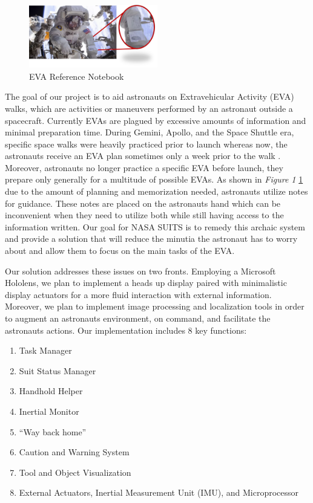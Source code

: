 \documentclass{article}
\begin{document}
\begin{figure}[!htb]
  \centering
  \includegraphics[width=0.5\textwidth]{assets/spacesuitdisplay.png}
  \caption{EVA Reference Notebook}
  \label{fig:spacesuitdisplay}
\end{figure}

The goal of our project is to aid astronauts on Extravehicular Activity 
(EVA) walks, which are activities or maneuvers performed by an astronaut 
outside a spacecraft. Currently EVAs are plagued by excessive amounts of 
information and minimal preparation time. During Gemini, Apollo, and the 
Space Shuttle era, specific space walks were heavily practiced prior to 
launch whereas now, the astronauts receive an EVA plan sometimes only a 
week prior to the walk \autocite{mannedspaceflight}. Moreover, 
astronauts no longer practice a specific EVA before launch, they prepare 
only generally for a multitude of possible EVAs. As shown in 
\textit{Figure 1} \ref{fig:spacesuitdisplay} due to the amount of 
planning and memorization needed, astronauts utilize notes for guidance. 
These notes are placed on the astronauts hand which can be inconvenient 
when they need to utilize both while still having access to the 
information written. Our goal for NASA SUITS is to remedy this archaic 
system and provide a solution that will reduce the minutia the astronaut 
has to worry about and allow them to focus on the main tasks of the EVA.

Our solution addresses these issues on two fronts. Employing a Microsoft 
Hololens, we plan to implement a heads up display paired with 
minimalistic display actuators for a more fluid interaction with 
external information. Moreover, we plan to implement image processing 
and localization tools in order to augment an astronauts environment, on 
command, and facilitate the astronauts actions. Our implementation 
includes 8 key functions:

\begin{enumerate}
\item Task Manager
\item Suit Status Manager
\item Handhold Helper
\item Inertial Monitor
\item “Way back home”
\item Caution and Warning System
\item Tool and Object Visualization
\item External Actuators, Inertial Measurement Unit (IMU), and 
Microprocessor
\end{enumerate}
\end{document}

